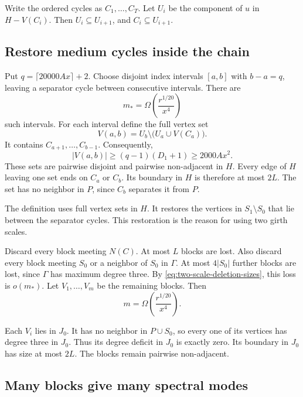 Write the ordered cycles as $C_1,\ldots,C_T$.
Let $U_i$ be the component of $u$ in $H-V(C_i)$.
Then $U_i\subseteq U_{i+1}$, and $C_i\subseteq U_{i+1}$.

\subsection{Restore medium cycles inside the chain}

Put $q=\lceil20000Ax\rceil+2$.
Choose disjoint index intervals $[a,b]$ with $b-a=q$, leaving a separator cycle between consecutive intervals.
There are
\[
 m_* = \Omega\!\left(\frac{r^{1/20}}{x^4}\right)
\]
such intervals.
For each interval define the full vertex set
\[
 V(a,b)=U_b\setminus\bigl(U_a\cup V(C_a)\bigr).
\]
It contains $C_{a+1},\ldots,C_{b-1}$.
Consequently,
\begin{equation}\label{eq:two-scale-block-volume}
 |V(a,b)|\ge(q-1)(D_1+1)\ge2000Ax^2.
\end{equation}
These sets are pairwise disjoint and pairwise non-adjacent in $H$.
Every edge of $H$ leaving one set ends on $C_a$ or $C_b$.
Its boundary in $H$ is therefore at most $2L$.
The set has no neighbor in $P$, since $C_b$ separates it from $P$.

The definition uses full vertex sets in $H$.
It restores the vertices in $S_1\setminus S_0$ that lie between the separator cycles.
This restoration is the reason for using two girth scales.

Discard every block meeting $N(C)$.
At most $L$ blocks are lost.
Also discard every block meeting $S_0$ or a neighbor of $S_0$ in $\Gamma$.
At most $4|S_0|$ further blocks are lost, since $\Gamma$ has maximum degree three.
By \eqref{eq:two-scale-deletion-sizes}, this loss is $o(m_*)$.
Let $V_1,\ldots,V_m$ be the remaining blocks.
Then
\begin{equation}\label{eq:two-scale-many-blocks}
 m=\Omega\!\left(\frac{r^{1/20}}{x^4}\right).
\end{equation}

Each $V_i$ lies in $J_0$.
It has no neighbor in $P\cup S_0$, so every one of its vertices has degree three in $J_0$.
Thus its degree deficit in $J_0$ is exactly zero.
Its boundary in $J_0$ has size at most $2L$.
The blocks remain pairwise non-adjacent.

\subsection{Many blocks give many spectral modes}

